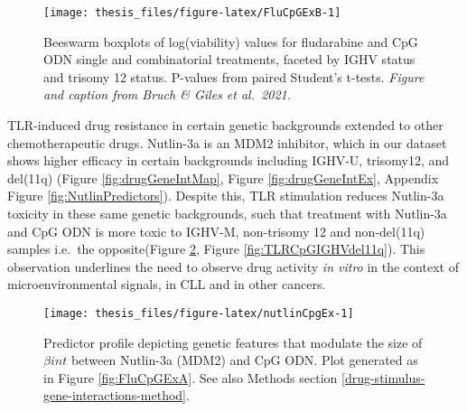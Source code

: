 \documentclass[11pt, a4paper, twosided]{book}
\begin{document}
\begin{figure}

{\centering \texttt{[image: thesis\_files/figure-latex/FluCpGExB-1]} 

}

\caption{Beeswarm boxplots of log(viability) values for fludarabine and CpG ODN single and combinatorial treatments, faceted by IGHV status and trisomy 12 status. P-values from paired Student's t-tests. \emph{Figure and caption from Bruch \& Giles et al.~2021.}}\label{fig:FluCpGExB}
\end{figure}
TLR-induced drug resistance in certain genetic backgrounds extended to other chemotherapeutic drugs. Nutlin-3a is an MDM2 inhibitor, which in our dataset shows higher efficacy in certain backgrounds including IGHV-U, trisomy12, and del(11q) (Figure \ref{fig:drugGeneIntMap}, Figure \ref{fig:drugGeneIntEx}, Appendix Figure \ref{fig:NutlinPredictors}). Despite this, TLR stimulation reduces Nutlin-3a toxicity in these same genetic backgrounds, such that treatment with Nutlin-3a and CpG ODN is more toxic to IGHV-M, non-trisomy 12 and non-del(11q) samples i.e.~the opposite(Figure \ref{fig:nutlinCpgEx}, Figure \ref{fig:TLRCpGIGHVdel11q}). This observation underlines the need to observe drug activity \emph{in vitro} in the context of microenvironmental signals, in CLL and in other cancers.


\begin{figure}

{\centering \texttt{[image: thesis\_files/figure-latex/nutlinCpgEx-1]} 

}

\caption{Predictor profile depicting genetic features that modulate the size of \(\beta{int}\) between Nutlin-3a (MDM2) and CpG ODN. Plot generated as in Figure \ref{fig:FluCpGExA}. See also Methods section \ref{drug-stimulus-gene-interactions-method}.}\label{fig:nutlinCpgEx}
\end{figure}
\end{document}
